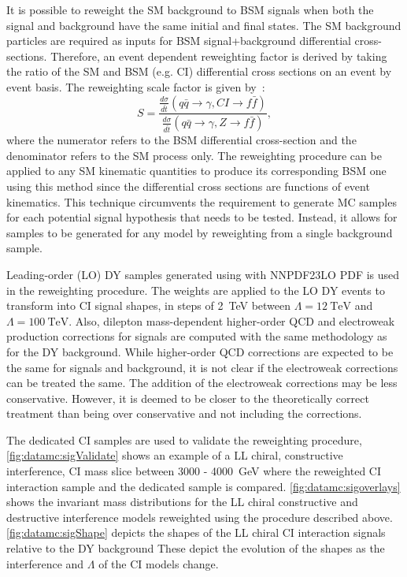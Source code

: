 It is possible to reweight the SM background to BSM signals when both the signal and background have the same initial and final states. The SM background particles are required as inputs for BSM signal+background differential cross-sections. Therefore, an event dependent reweighting factor is derived by taking the ratio of the SM and BSM (e.g. CI) differential cross sections on an event by event basis. The reweighting scale factor is given by~\cite{EXOT-2016-05}:
\begin{equation}
    S = \frac{\frac{d\sigma}{d\hat{t}}(q\bar{q} \rightarrow \gamma, CI \rightarrow f\bar{f})}{\frac{d\sigma}{d\hat{t}}(q\bar{q} \rightarrow \gamma, Z \rightarrow f\bar{f})},
\end{equation}
where the numerator refers to the BSM differential cross-section and the denominator refers to the SM process only. The reweighting procedure can be applied to any SM kinematic quantities to produce its corresponding BSM one using this method since the differential cross sections are functions of event kinematics. This technique circumvents the requirement to generate MC samples for each potential signal hypothesis that needs to be tested. Instead, it allows for samples to be generated for any model by reweighting from a single background sample. 

Leading-order (LO) DY samples generated using  with NNPDF23LO PDF is used in the reweighting procedure. The weights are applied to the LO DY events to transform into CI signal shapes, in steps of \SI{2}{\tera\electronvolt} between $\Lambda = \SI{12}{\tera\electronvolt}$ and $\Lambda = \SI{100}{\tera\electronvolt}$. Also, dilepton mass-dependent higher-order QCD and electroweak production corrections for signals are computed with the same methodology as for the DY background. While higher-order QCD corrections are expected to be the same for signals and background, it is not clear if the electroweak corrections can be treated the same. The addition of the electroweak corrections may be less conservative. However, it is deemed to be closer to the theoretically correct treatment than being over conservative and not including the corrections. 

The dedicated CI samples are used to validate the reweighting procedure, \cref{fig:datamc:sigValidate} shows an example of a LL chiral, constructive interference, CI mass slice between 3000 - \SI{4000}{\giga\electronvolt} where the reweighted CI interaction sample and the dedicated sample is compared. \cref{fig:datamc:sigoverlays} shows the invariant mass distributions for the LL chiral constructive and destructive interference models reweighted using the procedure described above. \cref{fig:datamc:sigShape} depicts the shapes of the LL chiral CI interaction signals relative to the DY background These depict the evolution of the shapes as the interference and $\Lambda$ of the CI models change. 


